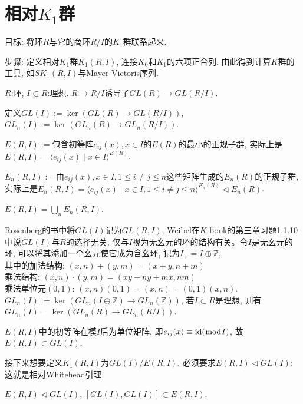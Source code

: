 \section{相对$K_1$群}
目标: 将环$R$与它的商环$R/I$的$K_1$群联系起来.

步骤: 定义相对$K_1$群$K_1(R,I)$, 连接$K_0$和$K_1$的六项正合列. 由此得到计算$K$群的工具, 如$SK_1(R,I)$与Mayer-Vietoris序列.

\begin{definition}
	$R$:环, $I\subset R$:理想. $R\rightarrow R/I$诱导了$GL(R)\rightarrow GL(R/I)$. 

	定义$GL(I):=\ker (GL(R)\rightarrow GL(R/I))$, $GL_n(I):=\ker(GL_n(R)\rightarrow GL_n(R/I))$.

	$E(R,I):=$包含初等阵$e_{ij}(x), x\in I$的$E(R)$的最小的正规子群, 实际上是$E(R,I)=\langle e_{ij}(x) \mid x\in I\rangle^{E(R)}$.

	$E_n(R,I):=$由$e_{ij}(x), x\in I, 1\leq i \neq j \leq n$这些矩阵生成的$E_n(R)$的正规子群, 实际上是$E_n(R,I)=\langle e_{ij}(x) \mid x\in I,1\leq i\neq j\leq n\rangle^{E_n(R)}\lhd E_n(R)$.

	$E(R,I)=\bigcup_nE_n(R,I)$.
\end{definition}
\begin{remark}
	Rosenberg的书中将$GL(I)$记为$GL(R,I)$, Weibel在$K$-book的第三章习题1.1.10中说$GL(I)$与$R$的选择无关, 仅与$I$视为无幺元的环的结构有关。令$I$是无幺元的环, 可以将其添加一个幺元使它成为含幺环, 记为$I_+=I\oplus \mathbb{Z}$,\\
	其中的加法结构: $(x,n)+(y,m)=(x+y,n+m)$\\
	乘法结构: $(x,n)\cdot (y,m)=(xy+ny+mx,nm)$\\
	乘法单位元$(0,1)$: $(x,n)(0,1)=(x,n)=(0,1)(x,n)$.\\
	$GL_n(I):=\ker(GL_n(I\oplus \mathbb{Z})\rightarrow GL_n(\mathbb{Z}))$, 若$I\subset R$是理想, 则有$GL_n(I)=\ker(GL_n(R)\rightarrow GL_n(R/I))$.

	$E(R,I)$中的初等阵在模$I$后为单位矩阵, 即$e_{ij}(x) \equiv \mathrm{id} (\bmod I)$, 故$E(R,I) \subset GL(I)$.


\end{remark}
接下来想要定义$K_1(R,I)$为$GL(I)/E(R,I)$, 必须要求$E(R,I)\lhd GL(I)$: 这就是相对Whitehead引理.
\begin{lemma}[相对Whitehead引理]
	$E(R,I)\lhd GL(I)$, $[GL(I),GL(I)]\subset E(R,I)$.
\end{lemma}
